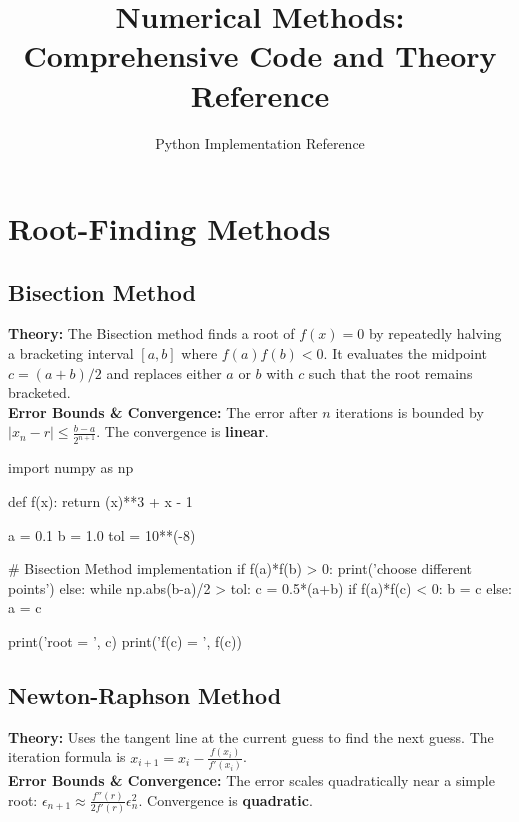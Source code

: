 \documentclass{article}
\title{Numerical Methods: Comprehensive Code and Theory Reference}
\author{Python Implementation Reference}
\date{}
\begin{document}
\maketitle
\tableofcontents
\newpage

\section{Root-Finding Methods}

\subsection{Bisection Method}
\textbf{Theory:} The Bisection method finds a root of $f(x) = 0$ by repeatedly halving a bracketing interval $[a, b]$ where $f(a)f(b) < 0$. It evaluates the midpoint $c = (a+b)/2$ and replaces either $a$ or $b$ with $c$ such that the root remains bracketed. \\
\textbf{Error Bounds \& Convergence:} The error after $n$ iterations is bounded by $|x_n - r| \le \frac{b - a}{2^{n+1}}$. The convergence is \textbf{linear}.

\begin{jupytercode}
import numpy as np

def f(x):
    return (x)**3 + x - 1

a = 0.1
b = 1.0
tol = 10**(-8)

# Bisection Method implementation
if f(a)*f(b) > 0:
    print('choose different points')
else:
    while np.abs(b-a)/2 > tol:
        c = 0.5*(a+b)
        if f(a)*f(c) < 0:
            b = c
        else:
            a = c
            
    print('root = ', c)
    print('f(c) = ', f(c))
\end{jupytercode}
\newpage

\subsection{Newton-Raphson Method}
\textbf{Theory:} Uses the tangent line at the current guess to find the next guess. The iteration formula is $x_{i+1} = x_i - \frac{f(x_i)}{f'(x_i)}$. \\
\textbf{Error Bounds \& Convergence:} The error scales quadratically near a simple root: $\epsilon_{n+1} \approx \frac{f''(r)}{2f'(r)} \epsilon_n^2$. Convergence is \textbf{quadratic}.
\end{document}
